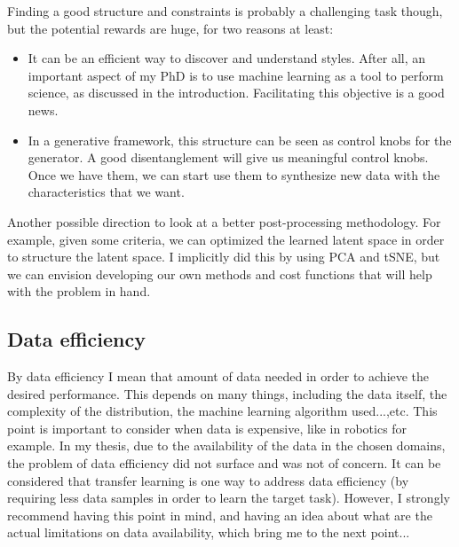     \par Finding a good structure and constraints is probably a challenging task though, but the potential rewards are huge, for two reasons at least:
    \begin{itemize}
      \item It can be an efficient way to discover and understand styles. After all, an important aspect of my PhD is to use machine learning as a tool to perform science, as discussed in the introduction. Facilitating this objective is a good news.
      \item In a generative framework, this structure can be seen as control knobs for the generator. A good disentanglement will give us meaningful control knobs. Once we have them, we can start use them to synthesize new data with the characteristics that we want.
    \end{itemize}

    \par Another possible direction to look at a better post-processing methodology. For example, given some criteria, we can optimized the learned latent space in order to structure the latent space. I implicitly did this by using PCA and tSNE, but we can envision developing our own methods and cost functions that will help with the problem in hand.


  \subsection{Data efficiency}
    \par By data efficiency I mean that amount of data needed in order to achieve the desired performance. This depends on many things, including the data itself, the complexity of the distribution, the machine learning algorithm used...,etc. This point is important to consider when data is expensive, like in robotics for example. In my thesis, due to the availability of the data in the chosen domains, the problem of data efficiency did not surface and was not of concern. It can be considered that transfer learning is one way to address data efficiency (by requiring less data samples in order to learn the target task). However, I strongly recommend having this point in mind, and having an idea about what are the actual limitations on data availability, which bring me to the next point...


